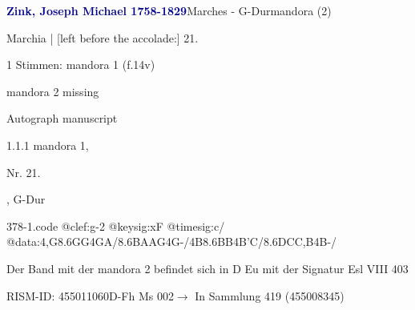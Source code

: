 \documentclass[twocolumn]{book}
\begin{document}
\par \vspace{7pt} \textcolor{darkblue}{\textbf{Zink, Joseph Michael  1758-1829}}\hfillplus{\textbf{[378]}}\newline Marches - G-Dur\newline mandora (2)
\par \begin{itshape}[f.14v, at left:] Marchia | [left before the accolade:] 21.\end{itshape} 
\par \textcolor{darkblue}{}  1 Stimmen: mandora 1  (f.14v)\newline \begin{small} mandora 2 missing\end{small} \newline Autograph manuscript
\par 1.1.1  mandora 1, \begin{itshape}Nr. 21.\end{itshape}, G-Dur  
\begin{filecontents*}{378-1.code}
@clef:g-2
@keysig:xF
@timesig:c/
@data:4,G{8.6GG}4GA/{8.6BA}{AG}4G-/4B{8.6BB}4B'C/{8.6DC}{C,B}4B-/
\end{filecontents*}
\newline
%
\par Der Band mit der mandora 2 befindet sich in D Eu mit der Signatur Esl VIII 403
\par RISM-ID: 455011060\newline D-Fh  Ms 002\newline $\rightarrow$ In Sammlung 419 (455008345)
      
\end{document}
